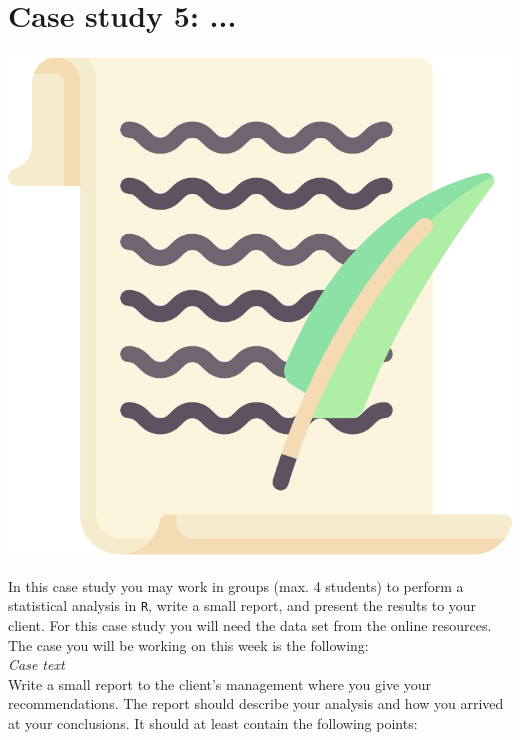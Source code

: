 
\begin{minipage}{0.8\textwidth}
\section{Case study 5: ...}
\end{minipage}%
\hfill%
\begin{minipage}{0.1\textwidth}
\includegraphics[width=\linewidth]{Files/Images/lettericon.pdf}
\end{minipage}
\vspace*{.1cm}

In this case study you may work in groups (max. 4 students) to perform a statistical analysis in \texttt{R}, write a small report, and present the results to your client. For this case study you will need the data set  from the online resources. The case you will be working on this week is the following: \\

\textit{Case text} \\

Write a small report to the client's management where you give your recommendations. The report should describe your analysis and how you arrived at your conclusions. It should at least contain the following points: \\

